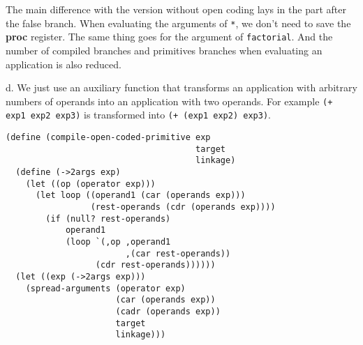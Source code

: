 \documentclass[a4paper,12pt]{article}
\newcommand{\subpar}[1]{\medskip \noindent #1.}
\begin{document}
The main difference with the version without open coding lays in the
part after the false branch.  When evaluating the arguments of
\lstinline!*!, we don't need to save the \textbf{proc} register.  The
same thing goes for the argument of \lstinline!factorial!.  And the
number of compiled branches and primitives branches when evaluating an
application is also reduced.

\subpar{d} We just use an auxiliary function that transforms an
application with arbitrary numbers of operands into an application
with two operands.  For example \lstinline!(+ exp1 exp2 exp3)!  is
transformed into \lstinline!(+ (exp1 exp2) exp3)!.

\begin{lstlisting}
(define (compile-open-coded-primitive exp
                                      target
                                      linkage)
  (define (->2args exp)
    (let ((op (operator exp)))
      (let loop ((operand1 (car (operands exp)))
                 (rest-operands (cdr (operands exp))))
        (if (null? rest-operands)
            operand1
            (loop `(,op ,operand1
                        ,(car rest-operands))
                  (cdr rest-operands))))))
  (let ((exp (->2args exp)))
    (spread-arguments (operator exp)
                      (car (operands exp))
                      (cadr (operands exp))
                      target
                      linkage)))
\end{lstlisting}
\end{document}
